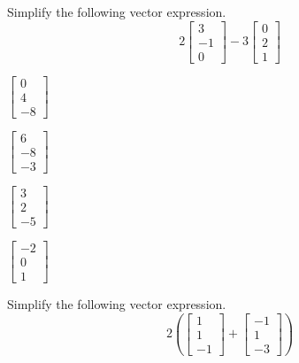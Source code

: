 \documentclass{article}
\begin{document}
\begin{readinessAssuranceTest}

\item Simplify the following vector expression.
  \[
  2
  \begin{bmatrix}
    3 \\ -1 \\ 0
  \end{bmatrix}-
  3
  \begin{bmatrix}
    0 \\ 2 \\ 1
  \end{bmatrix}
  \]

\begin{multicols}{4}
\begin{readinessAssuranceTestChoices}
\item \(
        \begin{bmatrix}
          0 \\ 4 \\ -8
        \end{bmatrix}
      \)
\item \(
        \begin{bmatrix}
          6 \\ -8 \\ -3
        \end{bmatrix}
      \) %
\item \(
        \begin{bmatrix}
          3 \\ 2 \\ -5
        \end{bmatrix}
      \)
\item \(
        \begin{bmatrix}
          -2 \\ 0 \\ 1
        \end{bmatrix}
      \)
\end{readinessAssuranceTestChoices}
\end{multicols}

\item Simplify the following vector expression.
  \[
  2\left(
  \begin{bmatrix}
    1 \\ 1 \\ -1
  \end{bmatrix}+
  \begin{bmatrix}
    -1 \\ 1 \\ -3
  \end{bmatrix}\right)
  \]


\end{readinessAssuranceTest}
\end{document}
